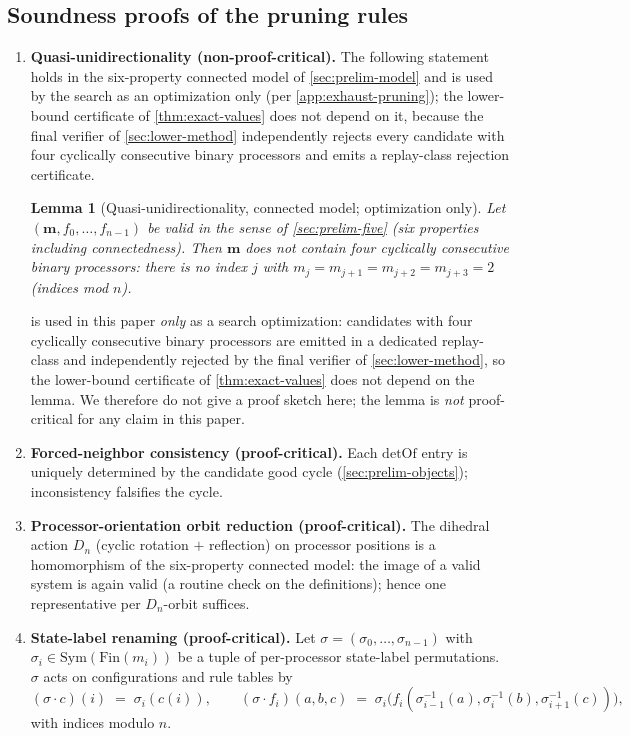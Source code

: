\documentclass[11pt,a4paper]{article}
\theoremstyle{plain}
\newtheorem{lemma}[theorem]{Lemma}
\theoremstyle{definition}
\newcommand{\detOf}{\mathrm{detOf}}
\begin{document}
\subsection{Soundness proofs of the pruning rules}\label{app:exhaust-sound}

\begin{enumerate}[leftmargin=*]
\item \textbf{Quasi-unidirectionality (non-proof-critical).}  The
following statement holds in the six-property connected model of
\cref{sec:prelim-model} and is used by the search as an optimization
only (per \cref{app:exhaust-pruning}); the lower-bound certificate
of \cref{thm:exact-values} does not depend
on it, because the final
verifier of \cref{sec:lower-method} independently rejects every
candidate with four cyclically consecutive binary processors and
emits a replay-class rejection certificate.

\begin{lemma}[Quasi-unidirectionality, connected model; optimization only]\label{lem:quasi-uni}
Let $(\mathbf{m}, f_0, \ldots, f_{n-1})$ be valid in the sense of
\cref{sec:prelim-five} (six properties including connectedness).
Then $\mathbf{m}$ does not contain four cyclically consecutive binary
processors: there is no index $j$ with
$m_j = m_{j+1} = m_{j+2} = m_{j+3} = 2$ (indices mod $n$).
\end{lemma}

 is used in this paper \emph{only} as a search
optimization: candidates with four cyclically consecutive binary
processors are emitted in a dedicated replay-class and
independently rejected by the final verifier of
\cref{sec:lower-method}, so the lower-bound certificate of
\cref{thm:exact-values} does not depend
on the lemma.  We therefore
do not give a proof sketch here; the lemma is \emph{not}
proof-critical for any claim in this paper.
\item\label{enumi:forced-neighbor} \textbf{Forced-neighbor consistency
(proof-critical).}  Each $\detOf$ entry is uniquely determined by the
candidate good cycle (\cref{sec:prelim-objects}); inconsistency
falsifies the cycle.
\item\label{enumi:orbit-red} \textbf{Processor-orientation orbit reduction (proof-critical).}  The dihedral
action $D_n$ (cyclic rotation $+$ reflection) on processor positions
is a homomorphism of the six-property connected model: the image of
a valid system is again valid (a routine check on the definitions);
hence one representative per $D_n$-orbit suffices.
\item\label{enumi:state-label} \textbf{State-label renaming (proof-critical).}  Let
$\sigma = (\sigma_0, \ldots, \sigma_{n-1})$ with
$\sigma_i \in \mathrm{Sym}(\mathrm{Fin}(m_i))$ be a tuple of
per-processor state-label permutations.  $\sigma$ acts on
configurations and rule tables by
\[
   (\sigma \cdot c)(i) \;=\; \sigma_i(c(i)),
   \qquad
   (\sigma \cdot f_i)(a, b, c) \;=\; \sigma_i\bigl(f_i(\sigma_{i-1}^{-1}(a),
   \sigma_i^{-1}(b), \sigma_{i+1}^{-1}(c))\bigr),
\]
with indices modulo $n$.


\end{enumerate}
\end{document}
